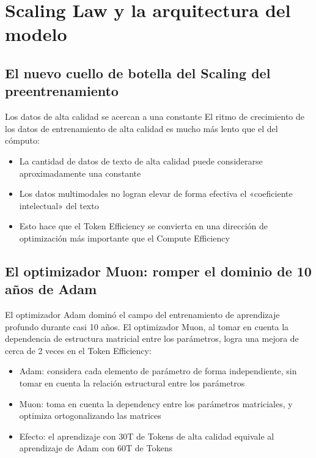 \section{Scaling Law y la arquitectura del modelo}

\subsection{El nuevo cuello de botella del Scaling del preentrenamiento}

\begin{warningbox}{Los datos de alta calidad se acercan a una constante}
El ritmo de crecimiento de los datos de entrenamiento de alta calidad es mucho más lento que el del cómputo:
\begin{itemize}
    \item La cantidad de datos de texto de alta calidad puede considerarse aproximadamente una constante
    \item Los datos multimodales no logran elevar de forma efectiva el «coeficiente intelectual» del texto
    \item Esto hace que el Token Efficiency se convierta en una dirección de optimización más importante que el Compute Efficiency
\end{itemize}
\end{warningbox}

\subsection{El optimizador Muon: romper el dominio de 10 años de Adam}

El optimizador Adam dominó el campo del entrenamiento de aprendizaje profundo durante casi 10 años. El optimizador Muon, al tomar en cuenta la dependencia de estructura matricial entre los parámetros, logra una mejora de cerca de 2 veces en el Token Efficiency:

\begin{itemize}
    \item Adam: considera cada elemento de parámetro de forma independiente, sin tomar en cuenta la relación estructural entre los parámetros
    \item Muon: toma en cuenta la dependency entre los parámetros matriciales, y optimiza ortogonalizando las matrices
    \item Efecto: el aprendizaje con 30T de Tokens de alta calidad equivale al aprendizaje de Adam con 60T de Tokens
\end{itemize}

